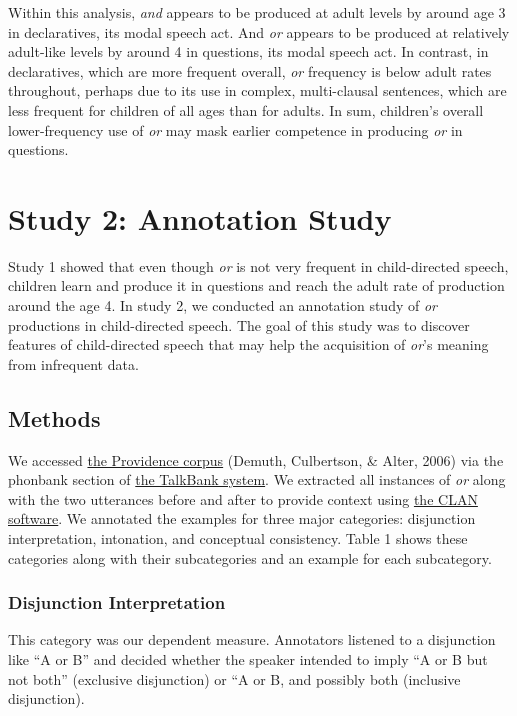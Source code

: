 \documentclass[10pt, letterpaper]{article}
\begin{document}
Within this analysis, \emph{and} appears to be produced at adult levels
by around age 3 in declaratives, its modal speech act. And \emph{or}
appears to be produced at relatively adult-like levels by around 4 in
questions, its modal speech act. In contrast, in declaratives, which are
more frequent overall, \emph{or} frequency is below adult rates
throughout, perhaps due to its use in complex, multi-clausal sentences,
which are less frequent for children of all ages than for adults. In
sum, children's overall lower-frequency use of \emph{or} may mask
earlier competence in producing \emph{or} in questions.

\section{Study 2: Annotation Study}\label{study-2-annotation-study}

Study 1 showed that even though \emph{or} is not very frequent in
child-directed speech, children learn and produce it in questions and
reach the adult rate of production around the age 4. In study 2, we
conducted an annotation study of \emph{or} productions in child-directed
speech. The goal of this study was to discover features of
child-directed speech that may help the acquisition of \emph{or}'s
meaning from infrequent data.

\subsection{Methods}\label{methods-1}

We accessed
\href{https://phonbank.talkbank.org/browser/index.php?url=Eng-NA/Providence/}{the
Providence corpus} (Demuth, Culbertson, \& Alter, 2006) via the phonbank
section of \href{https://talkbank.org/}{the TalkBank system}. We
extracted all instances of \emph{or} along with the two utterances
before and after to provide context using
\href{http://alpha.talkbank.org/clan/}{the CLAN software}. We annotated
the examples for three major categories: disjunction interpretation,
intonation, and conceptual consistency. Table 1 shows these categories
along with their subcategories and an example for each subcategory.

\subsubsection{Disjunction
Interpretation}\label{disjunction-interpretation}

This category was our dependent measure. Annotators listened to a
disjunction like ``A or B'' and decided whether the speaker intended to
imply ``A or B but not both'' (exclusive disjunction) or ``A or B, and
possibly both (inclusive disjunction).
\end{document}
